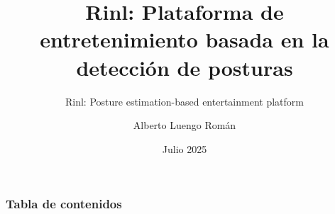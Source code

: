 \documentclass[xcolor=dvipsnames]{beamer}
\title{Rinl: Plataforma de entretenimiento basada en la detección de posturas}
\subtitle{Rinl: Posture estimation-based entertainment platform}
\author{Alberto Luengo Román}
\date{Julio 2025}
\begin{document}
\frame{\titlepage}

\begin{frame}
  \frametitle{Tabla de contenidos}
  \tableofcontents
\end{frame}






% 


\frame{\titlepage}

\appendix

\end{document}
